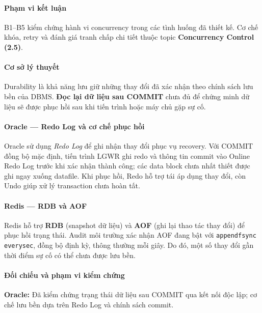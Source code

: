 \paragraph*{Phạm vi kết luận}

B1–B5 kiểm chứng hành vi concurrency trong các tình huống đã thiết kế. Cơ chế khóa, retry và đánh giá tranh chấp chi tiết thuộc topic \textbf{Concurrency Control (2.5)}.

\label{sec:tx-2-4}
\paragraph*{Cơ sở lý thuyết}

Durability là khả năng lưu giữ những thay đổi đã xác nhận theo chính sách lưu bền của DBMS. \textbf{Đọc lại dữ liệu sau COMMIT} chưa đủ để chứng minh dữ liệu sẽ được phục hồi sau khi tiến trình hoặc máy chủ gặp sự cố.

\paragraph*{Oracle — Redo Log và cơ chế phục hồi}

Oracle sử dụng \emph{Redo Log} để ghi nhận thay đổi phục vụ recovery. Với COMMIT đồng bộ mặc định, tiến trình LGWR ghi redo và thông tin commit vào Online Redo Log trước khi xác nhận thành công; các data block chưa nhất thiết được ghi ngay xuống datafile. Khi phục hồi, Redo hỗ trợ tái áp dụng thay đổi, còn Undo giúp xử lý transaction chưa hoàn tất.

\paragraph*{Redis — RDB và AOF}

Redis hỗ trợ \textbf{RDB} (snapshot dữ liệu) và \textbf{AOF} (ghi lại thao tác thay đổi) để phục hồi trạng thái. Audit môi trường xác nhận AOF đang bật với \texttt{appendfsync everysec}, đồng bộ định kỳ, thông thường mỗi giây. Do đó, một số thay đổi gần thời điểm sự cố có thể chưa được lưu bền.

\paragraph*{Đối chiếu và phạm vi kiểm chứng}

\textbf{Oracle:} Đã kiểm chứng trạng thái dữ liệu sau COMMIT qua kết nối độc lập; cơ chế lưu bền dựa trên Redo Log và chính sách commit.

